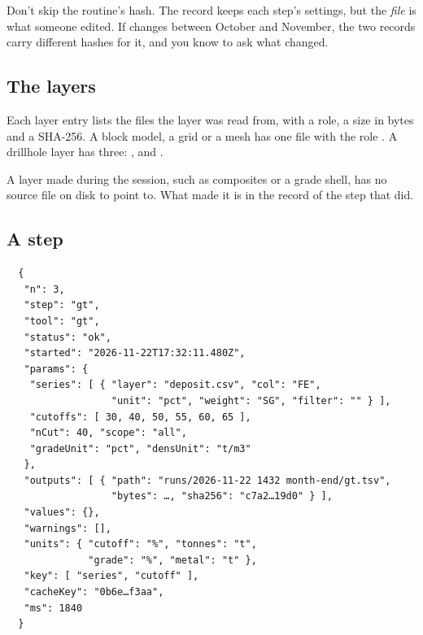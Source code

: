 Don't skip the routine's hash. The record keeps each step's settings, but the \emph{file} is what someone edited. If  changes between October and November, the two records carry different hashes for it, and you know to ask what changed.

\subsection{The layers}
Each layer entry lists the files the layer was read from, with a role, a size in bytes and a SHA-256. A block model, a grid or a mesh has one file with the role . A drillhole layer has three: ,  and .

A layer made during the session, such as composites or a grade shell, has no source file on disk to point to. What made it is in the record of the step that did.

\subsection{A step}
\begin{lstlisting}
  {
   "n": 3,
   "step": "gt",
   "tool": "gt",
   "status": "ok",
   "started": "2026-11-22T17:32:11.480Z",
   "params": {
    "series": [ { "layer": "deposit.csv", "col": "FE",
                  "unit": "pct", "weight": "SG", "filter": "" } ],
    "cutoffs": [ 30, 40, 50, 55, 60, 65 ],
    "nCut": 40, "scope": "all",
    "gradeUnit": "pct", "densUnit": "t/m3"
   },
   "outputs": [ { "path": "runs/2026-11-22 1432 month-end/gt.tsv",
                  "bytes": …, "sha256": "c7a2…19d0" } ],
   "values": {},
   "warnings": [],
   "units": { "cutoff": "%", "tonnes": "t",
              "grade": "%", "metal": "t" },
   "key": [ "series", "cutoff" ],
   "cacheKey": "0b6e…f3aa",
   "ms": 1840
  }
\end{lstlisting}

